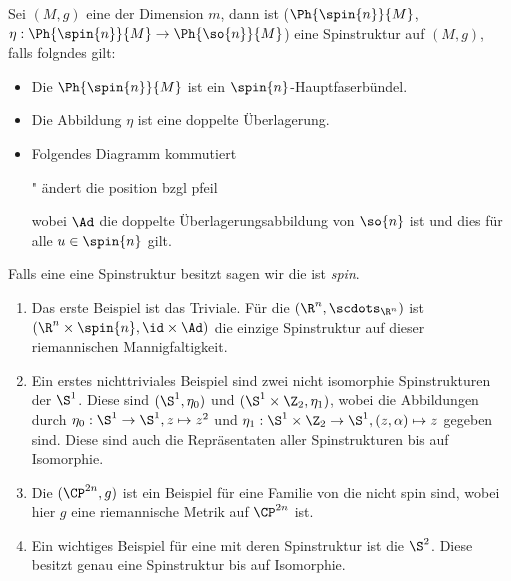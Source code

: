 \begin{Def}[Spinstruktur]
	Sei $(M,g)$ eine \RMF der Dimension $m$, dann ist
	 ($\Ph{\spin{n}}{M}$,$\eta : \Ph{\spin{n}}{M} \rightarrow \Ph{\so{n}}{M}$) eine Spinstruktur auf $(M,g)$, falls folgndes gilt:
	 \begin{itemize}
	 	\item Die \mfg $\Ph{\spin{n}}{M}$ ist ein $\spin{n}$-Hauptfaserbündel.
	 	\item Die Abbildung $\eta$ ist eine doppelte Überlagerung.
	 	\item Folgendes Diagramm kommutiert\\
		 	\begin{center}
		 		" ändert die position bzgl pfeil
			 \end{center}
			wobei $\Ad$ die doppelte Überlagerungsabbildung von $\so{n}$ ist
			und dies für alle $u \in \spin{n}$ gilt.
	 \end{itemize}
	 Falls eine \RMF eine Spinstruktur besitzt sagen wir die \mfg ist \textit{spin}.
	

\end{Def}

\begin{Bsp}
	\begin{enumerate}[(1)]
		\item Das erste Beispiel ist das Triviale. Für die \RMF $(\R^n, \scdots_{\R^n})$ ist $(\R^n \times \spin{n},\id \times \Ad)$ 
		die einzige Spinstruktur auf dieser riemannischen 
		Mannigfaltigkeit.
		\item Ein erstes nichttriviales Beispiel sind zwei nicht
		isomorphie Spinstrukturen der $\S^1$. Diese sind $(\S^1 , \eta_0)$ und $(\S^1 \times \Z_2 , \eta_1)$, wobei die Abbildungen durch $\eta_0 : \S^1 \rightarrow \S^1 , z \mapsto z^2$ und $\eta_1 : \S^1 \times \Z_2 \rightarrow \S^1 , (z,\alpha) \mapsto z$ gegeben sind. Diese sind auch die Repräsentaten aller Spinstrukturen bis auf 
		Isomorphie. 
		\item Die $(\CP^{2n},g)$ ist ein Beispiel für eine Familie von
		\RMFen die nicht spin sind, wobei
		hier $g$ eine riemannische Metrik
		auf $\CP^{2n}$ ist. 
		\item Ein wichtiges Beispiel für eine \RMF mit deren Spinstruktur ist die $\S^2$. Diese
		besitzt genau eine Spinstruktur bis auf Isomorphie. 
	\end{enumerate}
\end{Bsp}

